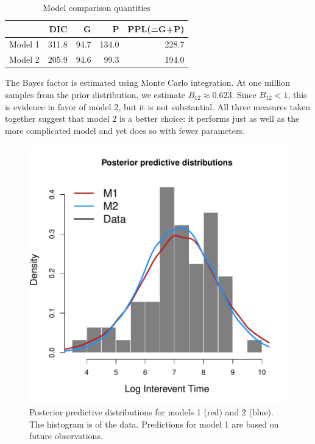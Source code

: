 \documentclass{asaproc}
\begin{document}
\begin{table}[h]
\caption{Model comparison quantities}
\centering
\begin{tabular}{lrrrr}
\\ [-5pt]
        & DIC   & G    & P      & PPL(=G+P) \\ \hline
Model 1 & 311.8 & 94.7 & 134.0  & 228.7   \\ 
Model 2 & 205.9 & 94.6 & 99.3   & 194.0   \\ 
   \hline
\end{tabular}
\end{table}

The Bayes factor is estimated using Monte Carlo integration. At one million samples from the prior distribution, we estimate $B_{12}\approx0.623$. Since $B_{12}<1$, this is evidence in favor of model 2, but it is not substantial. All three measures taken together suggest that model 2 is a better choice: it performs just as well as the more complicated model and yet does so with fewer parameters.

\begin{figure}
\centering
\includegraphics[scale=0.50]{figs/post_pred.pdf}
\caption{Posterior predictive distributions for models 1 (red) and 2 (blue). The histogram is of the data. Predictions for model 1 are based on future observations.}
\label{post_pred}
\end{figure}
\end{document}
